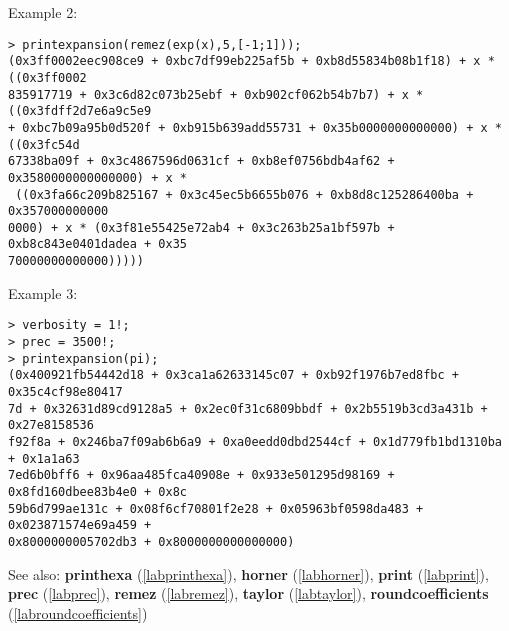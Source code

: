 \noindent Example 2: 
\begin{center}\begin{minipage}{15cm}\begin{Verbatim}[frame=single]
> printexpansion(remez(exp(x),5,[-1;1]));
(0x3ff0002eec908ce9 + 0xbc7df99eb225af5b + 0xb8d55834b08b1f18) + x * ((0x3ff0002
835917719 + 0x3c6d82c073b25ebf + 0xb902cf062b54b7b7) + x * ((0x3fdff2d7e6a9c5e9 
+ 0xbc7b09a95b0d520f + 0xb915b639add55731 + 0x35b0000000000000) + x * ((0x3fc54d
67338ba09f + 0x3c4867596d0631cf + 0xb8ef0756bdb4af62 + 0x3580000000000000) + x *
 ((0x3fa66c209b825167 + 0x3c45ec5b6655b076 + 0xb8d8c125286400ba + 0x357000000000
0000) + x * (0x3f81e55425e72ab4 + 0x3c263b25a1bf597b + 0xb8c843e0401dadea + 0x35
70000000000000)))))
\end{Verbatim}
\end{minipage}\end{center}
\noindent Example 3: 
\begin{center}\begin{minipage}{15cm}\begin{Verbatim}[frame=single]
> verbosity = 1!;
> prec = 3500!;
> printexpansion(pi);
(0x400921fb54442d18 + 0x3ca1a62633145c07 + 0xb92f1976b7ed8fbc + 0x35c4cf98e80417
7d + 0x32631d89cd9128a5 + 0x2ec0f31c6809bbdf + 0x2b5519b3cd3a431b + 0x27e8158536
f92f8a + 0x246ba7f09ab6b6a9 + 0xa0eedd0dbd2544cf + 0x1d779fb1bd1310ba + 0x1a1a63
7ed6b0bff6 + 0x96aa485fca40908e + 0x933e501295d98169 + 0x8fd160dbee83b4e0 + 0x8c
59b6d799ae131c + 0x08f6cf70801f2e28 + 0x05963bf0598da483 + 0x023871574e69a459 + 
0x8000000005702db3 + 0x8000000000000000)
\end{Verbatim}
\end{minipage}\end{center}
See also: \textbf{printhexa} (\ref{labprinthexa}), \textbf{horner} (\ref{labhorner}), \textbf{print} (\ref{labprint}), \textbf{prec} (\ref{labprec}), \textbf{remez} (\ref{labremez}), \textbf{taylor} (\ref{labtaylor}), \textbf{roundcoefficients} (\ref{labroundcoefficients})
